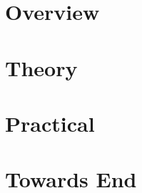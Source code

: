 \section[Overview]{Overview}


\section[Theory]{Theory}



%

\section[Practical]{Practical}






\section[End]{Towards End}



